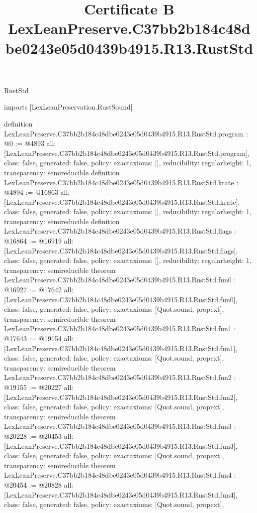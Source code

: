 \begin{lexlean}{RustStd}
\title{Certificate B LexLeanPreserve.C37bb2b184c48dbe0243e05d0439b4915.R13.RustStd}
\begin{coremodule}
imports [LexLeanPreservation.RustSound]

definition LexLeanPreserve.C37bb2b184c48dbe0243e05d0439b4915.R13.RustStd.program : @0 := @4893 {
  all: [LexLeanPreserve.C37bb2b184c48dbe0243e05d0439b4915.R13.RustStd.program],
  class: false,
  generated: false,
  policy: exact{axioms: []},
  reducibility: regular{height: 1},
  transparency: semireducible
}
definition LexLeanPreserve.C37bb2b184c48dbe0243e05d0439b4915.R13.RustStd.krate : @4894 := @16863 {
  all: [LexLeanPreserve.C37bb2b184c48dbe0243e05d0439b4915.R13.RustStd.krate],
  class: false,
  generated: false,
  policy: exact{axioms: []},
  reducibility: regular{height: 1},
  transparency: semireducible
}
definition LexLeanPreserve.C37bb2b184c48dbe0243e05d0439b4915.R13.RustStd.flags : @16864 := @16919 {
  all: [LexLeanPreserve.C37bb2b184c48dbe0243e05d0439b4915.R13.RustStd.flags],
  class: false,
  generated: false,
  policy: exact{axioms: []},
  reducibility: regular{height: 1},
  transparency: semireducible
}
theorem LexLeanPreserve.C37bb2b184c48dbe0243e05d0439b4915.R13.RustStd.fun0 : @16927 := @17642 {
  all: [LexLeanPreserve.C37bb2b184c48dbe0243e05d0439b4915.R13.RustStd.fun0],
  class: false,
  generated: false,
  policy: exact{axioms: [Quot.sound, propext]},
  transparency: semireducible
}
theorem LexLeanPreserve.C37bb2b184c48dbe0243e05d0439b4915.R13.RustStd.fun1 : @17643 := @19154 {
  all: [LexLeanPreserve.C37bb2b184c48dbe0243e05d0439b4915.R13.RustStd.fun1],
  class: false,
  generated: false,
  policy: exact{axioms: [Quot.sound, propext]},
  transparency: semireducible
}
theorem LexLeanPreserve.C37bb2b184c48dbe0243e05d0439b4915.R13.RustStd.fun2 : @19155 := @20227 {
  all: [LexLeanPreserve.C37bb2b184c48dbe0243e05d0439b4915.R13.RustStd.fun2],
  class: false,
  generated: false,
  policy: exact{axioms: [Quot.sound, propext]},
  transparency: semireducible
}
theorem LexLeanPreserve.C37bb2b184c48dbe0243e05d0439b4915.R13.RustStd.fun3 : @20228 := @20453 {
  all: [LexLeanPreserve.C37bb2b184c48dbe0243e05d0439b4915.R13.RustStd.fun3],
  class: false,
  generated: false,
  policy: exact{axioms: [Quot.sound, propext]},
  transparency: semireducible
}
theorem LexLeanPreserve.C37bb2b184c48dbe0243e05d0439b4915.R13.RustStd.fun4 : @20454 := @20828 {
  all: [LexLeanPreserve.C37bb2b184c48dbe0243e05d0439b4915.R13.RustStd.fun4],
  class: false,
  generated: false,
  policy: exact{axioms: [Quot.sound, propext]},
}
\end{coremodule}
\end{lexlean}
